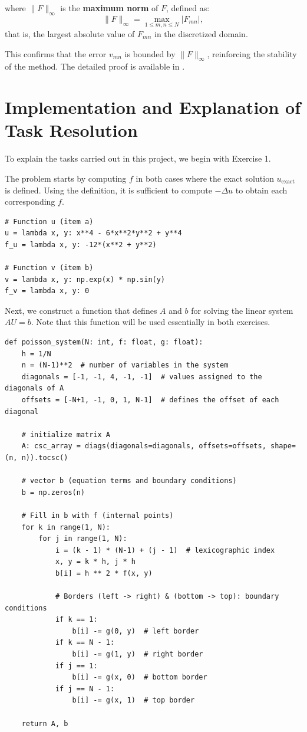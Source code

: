 \documentclass[aps,amsmath,amssymb,floatfix]{revtex4}
\begin{document}
where $\|F\|_\infty$ is the \textbf{maximum norm} of $F$, defined as:
\begin{equation*}
	\|F\|_\infty = \max_{1 \leq m,n \leq N} |F_{mn}|,
\end{equation*}
that is, the largest absolute value of $F_{mn}$ in the discretized domain.

This confirms that the error $v_{mn}$ is bounded by $\|F\|_\infty$, reinforcing the stability of the method. The detailed proof is available in \cite{Kuhl2024}.

                
\section{Implementation and Explanation of Task Resolution}

To explain the tasks carried out in this project, we begin with Exercise 1.

The problem starts by computing $f$ in both cases where the exact solution $u_{\text{exact}}$ is defined. Using the definition, it is sufficient to compute $-\Delta u$ to obtain each corresponding $f$.

\begin{lstlisting}
# Function u (item a)
u = lambda x, y: x**4 - 6*x**2*y**2 + y**4
f_u = lambda x, y: -12*(x**2 + y**2)

# Function v (item b)
v = lambda x, y: np.exp(x) * np.sin(y)
f_v = lambda x, y: 0
\end{lstlisting}

Next, we construct a function that defines $A$ and $b$ for solving the linear system $AU = b$. Note that this function will be used essentially in both exercises.


\begin{lstlisting}
def poisson_system(N: int, f: float, g: float):
    h = 1/N
    n = (N-1)**2  # number of variables in the system
    diagonals = [-1, -1, 4, -1, -1]  # values assigned to the diagonals of A
    offsets = [-N+1, -1, 0, 1, N-1]  # defines the offset of each diagonal

    # initialize matrix A
    A: csc_array = diags(diagonals=diagonals, offsets=offsets, shape=(n, n)).tocsc()

    # vector b (equation terms and boundary conditions)
    b = np.zeros(n)

    # Fill in b with f (internal points)
    for k in range(1, N):
        for j in range(1, N):
            i = (k - 1) * (N-1) + (j - 1)  # lexicographic index
            x, y = k * h, j * h
            b[i] = h ** 2 * f(x, y)

            # Borders (left -> right) & (bottom -> top): boundary conditions
            if k == 1:
                b[i] -= g(0, y)  # left border
            if k == N - 1:
                b[i] -= g(1, y)  # right border
            if j == 1:
                b[i] -= g(x, 0)  # bottom border
            if j == N - 1:
                b[i] -= g(x, 1)  # top border

    return A, b
\end{lstlisting}
\end{document}
